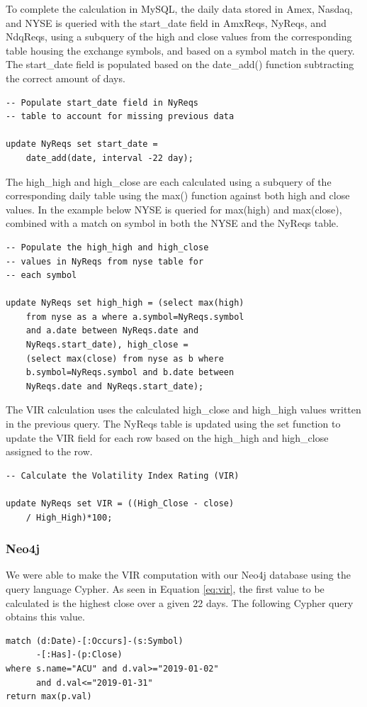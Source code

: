 \documentclass{IEEEtran}
\begin{document}
To complete the calculation in MySQL, the daily data stored in Amex, Nasdaq, and NYSE is queried with the start\_date field in AmxReqs, NyReqs, and NdqReqs, using a subquery of the high and close values from the corresponding table housing the exchange symbols, and based on a symbol match in the query. The start\_date field is populated based on the date\_add() function subtracting the correct amount of days.

\begin{verbatim}
-- Populate start_date field in NyReqs 
-- table to account for missing previous data 

update NyReqs set start_date = 
    date_add(date, interval -22 day);
\end{verbatim}  

The high\_high and high\_close are each calculated using a subquery of the corresponding daily table using the max() function against both high and close values.  In the example below NYSE is queried for max(high) and max(close), combined with a match on symbol in both the NYSE and the NyReqs table.  

\begin{verbatim}
-- Populate the high_high and high_close 
-- values in NyReqs from nyse table for 
-- each symbol 

update NyReqs set high_high = (select max(high) 
    from nyse as a where a.symbol=NyReqs.symbol 
    and a.date between NyReqs.date and 
    NyReqs.start_date), high_close = 
    (select max(close) from nyse as b where 
    b.symbol=NyReqs.symbol and b.date between 
    NyReqs.date and NyReqs.start_date); 
\end{verbatim}

The VIR calculation uses the calculated high\_close and high\_high values written in the previous query. The NyReqs table is updated using the set function to update the VIR field for each row based on the high\_high and high\_close assigned to the row.  

\begin{verbatim}
-- Calculate the Volatility Index Rating (VIR)  

update NyReqs set VIR = ((High_Close - close) 
    / High_High)*100; 
\end{verbatim}

\subsubsection{Neo4j}

We were able to make the VIR computation with our Neo4j database using the query language Cypher. As seen in Equation \ref{eq:vir}, the first value to be calculated is the highest close over a given 22 days. The following Cypher query obtains this value.
\begin{verbatim}
match (d:Date)-[:Occurs]-(s:Symbol)
      -[:Has]-(p:Close)  
where s.name="ACU" and d.val>="2019-01-02" 
      and d.val<="2019-01-31" 
return max(p.val) 
\end{verbatim} 
\end{document}
